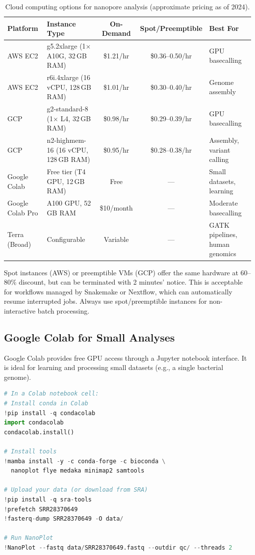 \begin{table}[htbp]
\centering
\caption{Cloud computing options for nanopore analysis (approximate pricing as of 2024).}
\label{tab:diy_cloud}
\begin{tabularx}{\textwidth}{@{}lXccX@{}}
\toprule
\textbf{Platform} & \textbf{Instance Type} & \textbf{On-Demand} & \textbf{Spot/Preemptible} & \textbf{Best For} \\
\midrule
AWS EC2 & g5.2xlarge (1$\times$ A10G, 32\,GB RAM) & \$1.21/hr & \$0.36--0.50/hr & GPU basecalling \\
AWS EC2 & r6i.4xlarge (16 vCPU, 128\,GB RAM) & \$1.01/hr & \$0.30--0.40/hr & Genome assembly \\
GCP & g2-standard-8 (1$\times$ L4, 32\,GB RAM) & \$0.98/hr & \$0.29--0.39/hr & GPU basecalling \\
GCP & n2-highmem-16 (16 vCPU, 128\,GB RAM) & \$0.95/hr & \$0.28--0.38/hr & Assembly, variant calling \\
Google Colab & Free tier (T4 GPU, 12\,GB RAM) & Free & --- & Small datasets, learning \\
Google Colab Pro & A100 GPU, 52\,GB RAM & \$10/month & --- & Moderate basecalling \\
Terra (Broad) & Configurable & Variable & --- & GATK pipelines, human genomics \\
\bottomrule
\end{tabularx}
\end{table}

\begin{tipbox}[title={Spot Instances Save 60--80\%}]
Spot instances (AWS) or preemptible VMs (GCP) offer the same hardware at 60--80\% discount, but can be terminated with 2 minutes' notice. This is acceptable for workflows managed by Snakemake or Nextflow, which can automatically resume interrupted jobs. Always use spot/preemptible instances for non-interactive batch processing.
\end{tipbox}

\subsection{Google Colab for Small Analyses}
\label{subsec:diyanalysis:colab}

Google Colab provides free GPU access through a Jupyter notebook interface. It is ideal for learning and processing small datasets (e.g., a single bacterial genome).

\begin{lstlisting}[language=Python,caption={Setting up a nanopore analysis environment in Google Colab.},label=lst:diy-colab]
# In a Colab notebook cell:
# Install conda in Colab
!pip install -q condacolab
import condacolab
condacolab.install()

# Install tools
!mamba install -y -c conda-forge -c bioconda \
  nanoplot flye medaka minimap2 samtools

# Upload your data (or download from SRA)
!pip install -q sra-tools
!prefetch SRR28370649
!fasterq-dump SRR28370649 -O data/

# Run NanoPlot
!NanoPlot --fastq data/SRR28370649.fastq --outdir qc/ --threads 2
\end{lstlisting}

